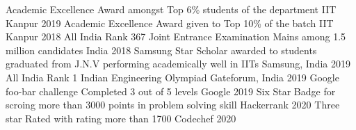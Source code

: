 
\begin{cvhonors}
	\cvhonor
	{Academic Excellence Award}
	{amongst Top 6\% students of the department}
	{IIT Kanpur}
	{2019}
  \cvhonor
    {Academic Excellence Award}
    {given to Top 10\% of the batch}
    {IIT Kanpur}
    {2018}
  \cvhonor
     {All India Rank 367}
    {Joint Entrance Examination Mains among 1.5 million candidates}
    {India}
    {2018}
  \cvhonor
     {Samsung Star Scholar}
    {awarded to students graduated from J.N.V performing academically well in IITs}
    {Samsung, India}
    {2019}
  \cvhonor
   {All India Rank 1}
    {Indian Engineering Olympiad}
    {Gateforum, India}
    {2019}
     \cvhonor
    {Google foo-bar challenge}
    {Completed 3 out of 5 levels}
    {Google}
    {2019}
    \cvhonor
    {Six Star Badge}
    {for scroing more than 3000 points in problem solving skill}
    {Hackerrank}
    {2020}
    \cvhonor
    {Three star Rated}
    {with rating more than 1700}
    {Codechef}
    {2020}
    
\end{cvhonors}


